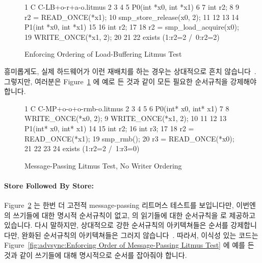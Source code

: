 \begin{figure}[tbp]
{ \scriptsize
\begin{verbbox}
 1 C C-LB+o-r+a-o.litmus
 2 {
 3 }
 4
 5 P0(int *x0, int *x1)
 6 {
 7   int r2;
 8
 9   r2 = READ_ONCE(*x1);
10   smp_store_release(x0, 2);
11 }
12
13
14 P1(int *x0, int *x1)
15 {
16   int r2;
17
18   r2 = smp_load_acquire(x0);
19   WRITE_ONCE(*x1, 2);
20 }
21
22 exists (1:r2=2 /\ 0:r2=2)
\end{verbbox}
}
\centering
\theverbbox
\caption{Enforcing Ordering of Load-Buffering Litmus Test}
\label{fig:advsync:Enforcing Ordering of Load-Buffering Litmus Test}
\end{figure}

흥미롭게도, 실제 하드웨어가 이런 재배치를 하는 경우는 상대적으로 흔치
않습니다~\cite{LucMaranget2017aarch64}.
그렇지만, 여러분은
Figure~\ref{fig:advsync:Enforcing Ordering of Load-Buffering Litmus Test} 에
예로 든 것과 같이 모든 필요한 순서규칙을 강제해야 합니다.

\begin{figure}[tbp]
{ \scriptsize
\begin{verbbox}
 1 C C-MP+o-o+o-rmb-o.litmus
 2
 3 {
 4 }
 5
 6 P0(int* x0, int* x1) {
 7
 8   WRITE_ONCE(*x0, 2);
 9   WRITE_ONCE(*x1, 2);
10
11 }
12
13 P1(int* x0, int* x1) {
14
15   int r2;
16   int r3;
17
18   r2 = READ_ONCE(*x1);
19   smp_rmb();
20   r3 = READ_ONCE(*x0);
21
22 }
23
24 exists (1:r2=2 /\ 1:r3=0)
\end{verbbox}
}
\centering
\theverbbox
\caption{Message-Passing Litmus Test, No Writer Ordering}
\label{fig:advsync:Message-Passing Litmus Test, No Writer Ordering}
\end{figure}

\paragraph{Store Followed By Store:}
Figure~\ref{fig:advsync:Message-Passing Litmus Test, No Writer Ordering}
는 한번 더 고전적 message-passing 리트머스 테스트를 보입니다만, 이번엔
 의 쓰기들에 대한 명시적 순서규칙이 없고,  의 읽기들에 대한
순서규칙을  로 제공하고 있습니다.
다시 말하지만, 상대적으로 강한 순서규칙의 아키텍쳐들은 순서를 강제합니다만,
완화된 순서규칙의 아키텍쳐들은 그러지 않습니다~\cite{JadeAlglave2011ppcmem}.
따라서, 이식성 있는 코드는
Figure~\ref{fig:advsync:Enforcing Order of Message-Passing Litmus Test} 에 예를
든 것과 같이 쓰기들에 대해 명시적으로 순서를 잡아줘야 합니다.
\iffalse

